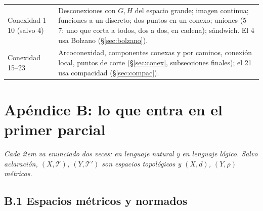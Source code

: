 \documentclass[11pt,a4paper]{article}
\theoremstyle{definition}
\theoremstyle{plain}
\newcommand{\tp}{\mathcal{T}}
\begin{document}
\begin{center}
\begin{tabular}{@{}p{4.5cm}p{10.5cm}@{}}
Conexidad 1--10 (salvo 4) & Desconexiones con $G,H$ del espacio grande; imagen continua; funciones a un discreto; dos puntos en un conexo; uniones (5--7: uno que corta a todos, dos a dos, en cadena); sándwich. El 4 usa Bolzano (\S\ref{sec:bolzano}).\\
Conexidad 15--23 & Arcoconexidad, componentes conexas y por caminos, conexión local, puntos de corte (\S\ref{sec:conex}, subsecciones finales); el 21 usa compacidad (\S\ref{sec:compac}).\\
\hline
\end{tabular}
\end{center}

\clearpage
\section*{Apéndice B: lo que entra en el primer parcial}

\noindent\emph{Cada ítem va enunciado dos veces: en lenguaje natural y en lenguaje lógico. Salvo aclaración, $(X,\tp)$, $(Y,\tp')$ son espacios topológicos y $(X,d)$, $(Y,\rho)$ métricos.}

\newcommand{\ficha}[1]{\item \textbf{#1.}\ }

\subsection*{B.1 Espacios métricos y normados}
\end{document}
